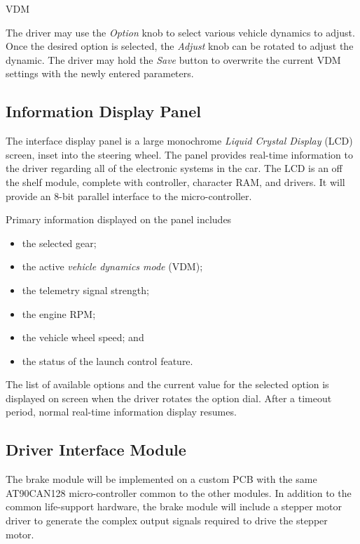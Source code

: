 \begin{description}
	\item[VDM] 

\end{description}

The driver may use the \emph{Option} knob to select various vehicle dynamics to adjust. Once the desired option is selected, the \emph{Adjust} knob can be rotated to adjust the dynamic. The driver may hold the \emph{Save} button to overwrite the current VDM settings with the newly entered parameters. 

\subsection{Information Display Panel}

The interface display panel is a large monochrome \emph{Liquid Crystal Display} (LCD) screen, inset into the steering wheel. The panel provides real-time information to the driver regarding all of the electronic systems in the car. The LCD  is an off the shelf module, complete with controller, character RAM, and drivers. It will provide an 8-bit parallel interface to the micro-controller. 

Primary information displayed on the panel includes

\begin{itemize}
\item the selected gear;
\item the active \emph{vehicle dynamics mode} (VDM);
\item the telemetry signal strength;
\item the engine RPM;
\item the vehicle wheel speed; and
\item the status of the launch control feature.
\end{itemize}

The list of available options and the current value for the selected option is displayed on screen when the driver rotates the option dial. After a timeout period, normal real-time information display resumes. 

\subsection{Driver Interface Module}

The brake module will be implemented on a custom PCB with the same AT90CAN128 micro-controller common to the other modules. In addition to the common life-support hardware, the brake module will include a stepper motor driver to generate the complex output signals required to drive the stepper motor.

